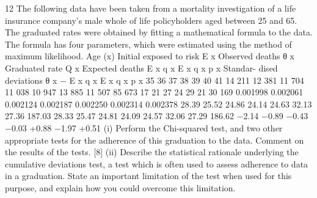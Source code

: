 \documentclass[a4paper,12pt]{article}
\begin{document}
12
The following data have been taken from a mortality investigation of a life
insurance company’s male whole of life policyholders aged between 25 and 65.
The graduated rates were obtained by fitting a mathematical formula to the
data. The formula has four parameters, which were estimated using the method
of maximum likelihood.
Age
(x)
Initial
exposed
to risk
E x
Observed
deaths
θ x
Graduated
rate
Q x
Expected
deaths
E x q x
E x q x p x
Standar-
dised
deviations
θ x − E x q x
E x q x p x
35
36
37
38
39
40
41
14 211
12 381
11 704
11 038
10 947
13 885
11 507
85 673
17
21
27
24
29
21
30
169
0.001998
0.002061
0.002124
0.002187
0.002250
0.002314
0.002378
28.39
25.52
24.86
24.14
24.63
32.13
27.36
187.03
28.33
25.47
24.81
24.09
24.57
32.06
27.29
186.62
−2.14
−0.89
−0.43
−0.03
+0.88
−1.97
+0.51
(i) Perform the Chi-squared test, and two other appropriate tests for the
adherence of this graduation to the data. Comment on the results of the
tests.
[8]
(ii) Describe the statistical rationale underlying the cumulative deviations
test, a test which is often used to assess adherence to data in a
graduation. State an important limitation of the test when used for this
purpose, and explain how you could overcome this limitation.
\end{document}
